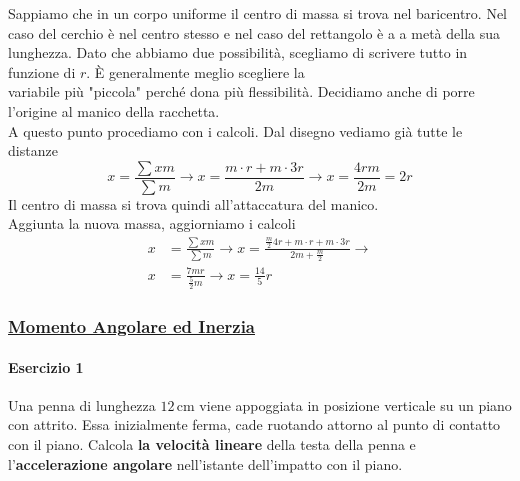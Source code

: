 Sappiamo che in un corpo uniforme il centro di massa si trova nel baricentro. Nel caso del cerchio è
nel centro stesso e nel caso del rettangolo è a a metà della sua lunghezza. Dato che abbiamo due 
possibilità, scegliamo di scrivere tutto in funzione di $r$. È generalmente meglio scegliere la \\
variabile più "piccola" perché dona più flessibilità. Decidiamo anche di porre l'origine al manico 
della racchetta.\\
A questo punto procediamo con i calcoli. Dal disegno vediamo già tutte le distanze
\begin{equation*}
  x = \frac{\sum xm}{\sum m} \rightarrow x = \frac{m\cdot r + m\cdot 3r}{2m} \rightarrow
  x = \frac{4rm}{2m} = \boxed{2r}
\end{equation*}
Il centro di massa si trova quindi all'attaccatura del manico.\\
Aggiunta la nuova massa, aggiorniamo i calcoli
\begin{align*}
  x &= \frac{\sum xm}{\sum m} \rightarrow 
  x=\frac{\frac{m}{2}4r + m\cdot r + m\cdot 3r}{2m+\frac{m}{2}}\rightarrow\\
  x &= \frac{7mr}{\frac{5}{2}m} \rightarrow x = \boxed{\frac{14}{5}r}
\end{align*}

\subsubsection*{\hyperref[subsec:dinamica:inerzia]{Momento Angolare ed Inerzia}}\label{ex:inerzia}
\paragraph{Esercizio 1}
Una penna di lunghezza $12\,\text{cm}$ viene appoggiata in posizione verticale su un piano con 
attrito. Essa inizialmente ferma, cade ruotando attorno al punto di contatto con il piano. Calcola
\textbf{la velocità lineare} della testa della penna e l'\textbf{accelerazione angolare} nell'istante 
dell'impatto con il piano.
\divisor

